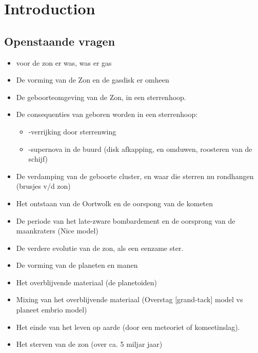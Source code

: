 \documentclass[11pt,fleqn]{book} %
\begin{document}

\pagestyle{fancy} %



\chapter{Introduction}

\section{Openstaande vragen}

   
\begin{itemize} 
\item voor de zon er was, was er gas
\item De vorming van de Zon en de gasdisk er omheen
\item De geboorteomgeving van de Zon, in een sterrenhoop.
\item De consequenties van geboren worden in een sterrenhoop:
  \begin{itemize} 
  \item    -verrijking door sterrenwing
  \item    -supernova in de buurd (disk afkapping, en omduwen, roosteren van de schijf)
  \end{itemize} 
\item De verdamping van de geboorte cluster, en waar die sterren nu rondhangen (brusjes v/d zon)
\item Het ontstaan van de Oortwolk en de oorspong van de kometen
\item De periode van het late-zware bombardement en de oorsprong van de maankraters (Nice model)
\item De verdere evolutie van de zon, als een eenzame ster.
\item De vorming van de planeten en manen
\item Het overblijvende materiaal (de planetoiden)
\item Mixing van het overblijvende materiaal (Overstag [grand-tack] model vs planeet embrio model)
\item Het einde van het leven op aarde (door een meteoriet of komeetinslag).
\item Het sterven van de zon (over ca. 5 miljar jaar)
\end{itemize}
\end{document}

